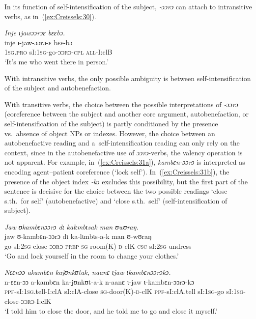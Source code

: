 \documentclass[output=paper]{langscibook}
\begin{document}
In its function of self-intensification of the subject, \textit{‑ɔɔrɔ} can attach
to intransitive verbs, as in~(\ref{ex:Creissels:30}).

\ea\label{ex:Creissels:30}

    \textit{Inje ɩjawɔɔrɔɛ bɛɛbɔ.}\\
    \gll inje ɩ-jaw-ɔɔrɔ-ɛ bɛɛ-bɔ\\
    \textsc{1sg.pro} sI:\textsc{1sg}-go-\textsc{ɔɔrɔ-cpl} \textsc{all}-I:clB\\
    \glt `It's me who went there in person.'

\z

With intransitive verbs, the only possible ambiguity is between
self-in\-ten\-si\-fi\-ca\-tion of the subject and autobenefaction.

With transitive verbs, the choice between the possible interpretations of
\textit{‑ɔɔrɔ} (coreference between the subject and another core argument,
autobenefaction, or self-intensification of the subject) is partly conditioned
by the presence vs.\ absence of object NPs or indexes.  However, the choice
between an autobenefactive reading and a~self-intensification reading can only
rely on the context, since in the autobenefactive use of \textit{ɔɔrɔ}-verbs, the
valency operation is not apparent.  For example, in~(\ref{ex:Creissels:31a}),
\textit{kambɛn-ɔɔrɔ} is interpreted as encoding agent--patient coreference (`lock
self').  In~(\ref{ex:Creissels:31b}), the presence of the object index \textit{‑kɔ}
excludes this possibility, but the first part of the sentence is decisive for
the choice between the two possible readings `close s.th.\ for self'
(autobenefactive) and `close s.th.\ self' (self-intensification of subject).

\ea
  \label{ex:Creissels:31}
  
    \ea\label{ex:Creissels:31a}
    
      \textit{Jaw ʊkambɛnɔɔrɔ dɩ kalɩmbɩsak man ʊwʊraŋ.}\\
      \gll jaw ʊ-kambɛn-ɔɔrɔ dɩ ka-lɩmbɩs-a-k man ʊ-wʊraŋ\\
      go sI:\textsc{2sg}-close-\textsc{ɔɔrɔ} \textsc{prep} \textsc{sg}-room(K)-\textsc{d}-clK
      \textsc{csc} sI:\textsc{2sg}-undress\\
      \glt `Go and lock yourself in the room to change your clothes.'


    \ex\label{ex:Creissels:31b}
    
      \textit{Nɛɛnɔɔ akambɛn kajʊnkʊtak, naanɛ ɩjaw ɩkambɛnɔɔrɔkɔ.}\\
      \gll n-ɛɛn-ɔɔ a-kambɛn ka-jʊnkʊt-a-k n-aanɛ ɩ-jaw ɩ-kambɛn-ɔɔrɔ-kɔ\\
      \textsc{ppf}-sI:\textsc{1sg}.tell-I:clA sI:clA-close \textsc{sg}-door(K)-\textsc{d}-clK
      \textsc{ppf}-sI:clA.tell sI:\textsc{1sg}-go sI:\textsc{1sg}-close-\textsc{ɔɔrɔ}-I:clK\\
      \glt `I told him to close the door, and he told me to go and close it myself.'
\end{document}
